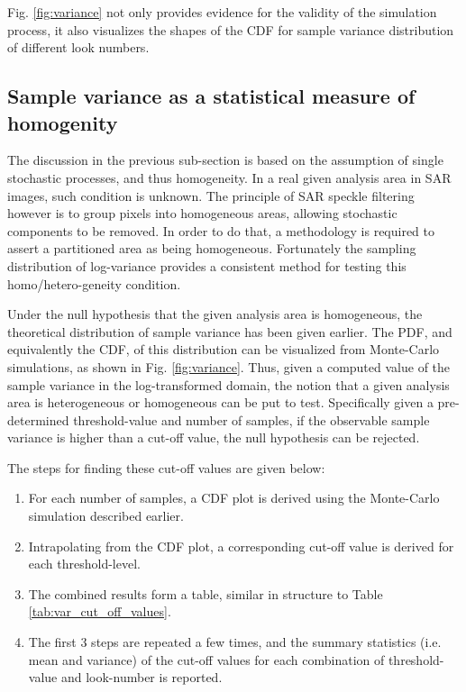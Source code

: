 Fig. \ref{fig:variance} not only provides evidence for the validity of the simulation process,
  it also visualizes the shapes of the CDF for sample variance distribution of different look numbers. 

\subsection{Sample variance as a statistical measure of homogenity}

The discussion in the previous sub-section is based on the assumption of single stochastic processes, and thus homogeneity.  
In a real given analysis area in SAR images, such condition is unknown. 
The principle of SAR speckle filtering however is to group pixels into homogeneous areas, allowing stochastic components to be removed. 
In order to do that, a methodology is required to assert a partitioned area as being homogeneous. 
Fortunately the sampling distribution of log-variance provides a consistent method for testing this homo/hetero-geneity condition.

Under the null hypothesis that the given analysis area is homogeneous,
  the theoretical distribution of sample variance has been given earlier. 
The PDF, and equivalently the CDF, of this distribution can be visualized from Monte-Carlo simulations, as shown in Fig. \ref{fig:variance}. 
Thus, given a computed value of the sample variance in the log-transformed domain,
  the notion that a given analysis area is heterogeneous or homogeneous can be put to test. 
Specifically given a pre-determined threshold-value and number of samples,
  if the observable sample variance is higher than a cut-off value, the null hypothesis can be rejected. 

The steps for finding these cut-off values are given below:

\begin{enumerate}
\item For each number of samples, a CDF plot is derived using the Monte-Carlo simulation described earlier.
  \item Intrapolating from the CDF plot, a corresponding cut-off value is derived for each threshold-level.
  \item The combined results form a table, similar in structure to Table \ref{tab:var_cut_off_values}.
  \item The first 3 steps are repeated a few times,
     and the summary statistics (i.e. mean and variance) of the cut-off values for each combination of threshold-value and look-number is reported.  
\end{enumerate}

